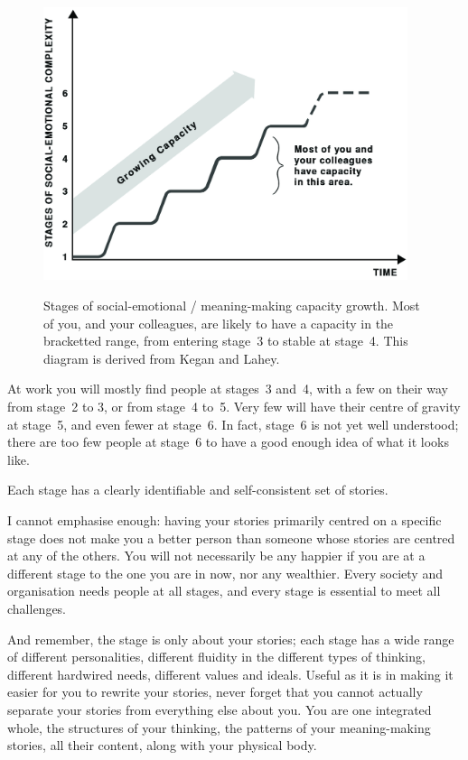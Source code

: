 \begin{figure}[htb]
\includegraphics[width=0.95\textwidth]{./Images/Socio-Emo-Stages}
\caption[Social-emotional / meaning-making capacity]{Stages of social-emotional / meaning-making capacity growth. Most of you, and your colleagues, are likely to have a capacity in the bracketted range, from entering stage~3 to stable at stage~4. This diagram is derived from Kegan and Lahey\cite{kegan-immunity}.}
\label{fig:social-emotional-stages}
\end{figure}


At work you will mostly find people at stages~3 and~4, with a few on their way from stage~2 to 3, or from stage~4 to~5. Very few will have their centre of gravity at stage~5, and even fewer at stage~6. In fact, stage~6 is not yet well understood; there are too few people at stage~6 to have a good enough idea of what it looks like.


Each stage has a clearly identifiable and self-consistent set of stories. 


I cannot emphasise enough: having your stories primarily centred on a specific stage does not make you a better person than someone whose stories are centred at any of the others. You will not necessarily be any happier if you are at a different stage to the one you are in now, nor any wealthier. Every society and organisation needs people at all stages, and every stage is essential to meet all challenges. 


And remember, the stage is only about your stories; each stage has a wide range of different personalities, different fluidity in the different types of thinking, different hardwired needs, different values and ideals. Useful as it is in making it easier for you to rewrite your stories, never forget that you cannot actually separate your stories from everything else about you. You are one integrated whole, the structures of your thinking, the patterns of your meaning-making stories, all their content, along with your physical body. 


